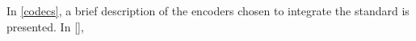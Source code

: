 \documentclass[
	12pt,				%
	openright,			%
	twoside,			%
	a4paper,			%
	brazil,
	french,				%
	english
	]{abntex2}
\begin{document}

In \autoref{codecs}, a brief description of the encoders chosen to integrate the standard is presented. In \autoref{}, 


%
%
%
%
%
%
%
\end{document}
